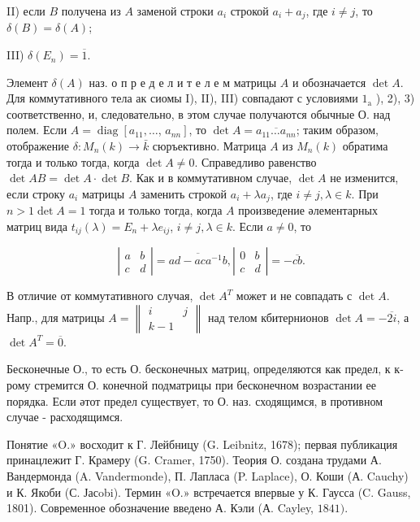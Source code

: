 \documentclass[10pt]{article}
\begin{document}
II) если $B$ получена из $A$ заменой строки $a_{i}$ строкой $a_{i}+a_{j}$, где $i \neq j$, то $\delta(B)=\delta(A)$;

III) $\delta\left(E_{n}\right)=\overline{1}$.

Элемент $\delta(A)$ наз. о п р е д е л и т е л е м матрицы $A$ и обозначается $\operatorname{det} A$. Для коммутативного тела ак сиомы I), II), III) совпадают с условиями $1_{\mathrm{a}}$ ), 2), 3) соответственно, и, следовательно, в этом случае получаются обычные О. над полем. Если $A=\operatorname{diag}\left[a_{11}, \ldots\right.$, $\left.a_{n n}\right]$, то $\operatorname{det} A=\overline{a_{11} \ldots a_{n n}}$; таким образом, отображение $\delta: M_{n}(k) \rightarrow \bar{k}$ сюръективно. Матрица $A$ из $M_{n}(k)$ обратима тогда и только тогда, когда $\operatorname{det} A \neq 0$. Справедливо равенство $\operatorname{det} A B=\operatorname{det} A \cdot \operatorname{det} B$. Как и в коммутативном случае, $\operatorname{det} A$ не изменится, если строку $a_{i}$ матрицы $A$ заменить строкой $a_{i}+\lambda a_{j}$, где $i \neq j, \lambda \in k$. При $n>1 \operatorname{det} A=1$ тогда и только тогда, когда $A$ произведение әлементарных матриц вида $t_{i j}(\lambda)=E_{n}+\lambda e_{i j}$, $i \neq j, \lambda \in k$. Если $a \neq 0$, то

\[
\left|\begin{array}{ll}
a & b \\
c & d
\end{array}\right|=\overline{a d-a c a^{-1} b},\left|\begin{array}{ll}
0 & b \\
c & d
\end{array}\right|=-\overline{c b} .
\]

В отличие от коммутативного случая, $\operatorname{det} A^{T}$ может и не совпадать с $\operatorname{det} A$. Напр., для матрицы $A=\left\|\begin{array}{cc}i & j \\ k-1\end{array}\right\|$ над телом кбитернионов $\operatorname{det} A=-\overline{2 i}$, а $\operatorname{det} A^{T}=\overline{0}$.

Бесконечные О., то есть О. бесконечных матриц, определяются как предел, к к-рому стремится О. конечной подматрицы при бесконечном возрастании ее порядка. Если әтот предел существует, то О. наз. сходящимся, в противном случае - расходящимся.

Понятие «O.» восходит к Г. Лейбницу (G. Leibnitz, 1678); первая публикация принацлежит Г. Крамеру (G. Cramer, 1750). Теория О. создана трудами А. Вандермонда (A. Vandermonde), П. Лапласа (P. Laplace), О. Коши (А. Cauchy) и К. Якоби (С. Јасobi). Термин «O.» встречается впервые у К. Гаусса (C. Gauss, 1801). Современное обозначение введено А. Кэли (А. Cayley, $1841)$.
\end{document}
